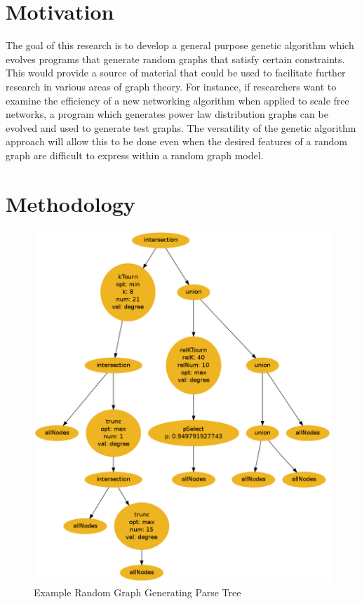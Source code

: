 \documentclass{article}
\begin{document}
\section{Motivation}

The goal of this research is to develop a general purpose genetic algorithm which evolves programs
that generate random graphs that satisfy certain constraints. This would provide a source of material
that could be used to facilitate further research in various areas of graph theory. For instance, if
researchers want to examine the efficiency of a new networking algorithm when applied to scale free
networks, a program which generates power law distribution graphs can be evolved and used to generate
test graphs. The versatility of the genetic algorithm approach will allow this to be done even when the
desired features of a random graph are difficult to express within a random graph model.

\section{Methodology}

\begin{figure}
\begin{centering}
  \includegraphics[scale=0.4]{RandomGraphExample2.png}
  \caption{Example Random Graph Generating Parse Tree}
  \label{fig:example}
\end{centering}
\end{figure}
\end{document}
